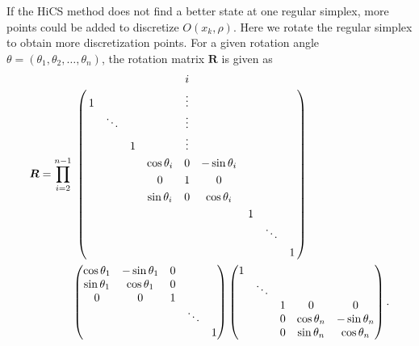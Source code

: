 \documentclass[final,1p,times]{elsarticle}
\begin{document}
If the HiCS method does not find a better state at one regular
simplex, more points could be added to discretize $O(x_k, \rho)$.
Here we rotate the regular simplex to obtain more discretization points.
For a given rotation angle $\theta=(\theta_1,\theta_2,\dots,\theta_{n})$, the
rotation matrix $\bm R$ is given as 
\begin{equation}
\begin{aligned}
	{\bm R} = 
	 \prod_{i=2}^{n-1} &
\bordermatrix{
  &  &       &  & 		   & i &		   &  &  & \cr
  & 1&       &  & 		   & \vdots  & 		   &  &  &  \cr
  &  & \ddots&  & 		   & \vdots  & 		   &  &  &  \cr
  &  &       & 1&          & \vdots  & 		   &  &  &  \cr
  &  &       &  & \cos \theta_i & 0 & -\sin \theta_i &  &  &  \cr
  &  &       &  &   0	 & 1 &     0     &  &  & \cr 
  &  &       &  & \sin \theta_i & 0 &  \cos \theta_i &  &  &  \cr
  &  &       &  &          &   &           & 1 & &  \cr
  &  &       &  &          &   &           &  & \ddots &   \cr
  &  &       &  &          &   &           &  &  & 1 
}
\\
	& \begin{pmatrix}
  \cos \theta_1 & -\sin \theta_1 & 0 &  		&   \\
  \sin \theta_1 & \cos \theta_1  & 0 & 	 	& 	\\
  	0	   &      0    & 1 & 		&   \\
  		   & 		   &   & \ddots &   \\
  		   & 		   &   &   		& 1 
	\end{pmatrix}
	\begin{pmatrix}
  1 &  &  &  		&   \\
    & \ddots  &  & 	 	& 	\\
    &    & 1 & 	0	& 0  \\
    &    & 0 & \cos\theta_n & -\sin\theta_n  \\
    & 	 & 0 &  \sin\theta_n & \cos\theta_n 
	\end{pmatrix}.
\end{aligned}
	\label{}
\end{equation}
\end{document}
